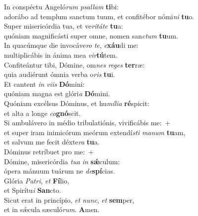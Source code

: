 \evenverse In conspéctu Angeló\textit{rum} \textit{psal}\textit{lam} \textbf{ti}bi:~\*\\
\evenverse adorábo ad templum sanctum tuum, et confitébor nómi\textit{ni} \textbf{tu}o.\\
\oddverse Super misericórdia tua, et ve\textit{ri}\textit{tá}\textit{te} \textbf{tu}a:~\*\\
\oddverse quóniam magnificásti super omne, nomen san\textit{ctum} \textbf{tu}um.\\
\evenverse In quacúmque die invocáve\textit{ro} \textit{te}, \textit{e}\textbf{xáu}di me:~\*\\
\evenverse multiplicábis in ánima mea \textit{vir}\textbf{tú}tem.\\
\oddverse Confiteántur tibi, Dómine, om\textit{nes} \textit{re}\textit{ges} \textbf{ter}ræ:~\*\\
\oddverse quia audiérunt ómnia verba o\textit{ris} \textbf{tu}i.\\
\evenverse Et cantent \textit{in} \textit{vi}\textit{is} \textbf{Dó}mini:~\*\\
\evenverse quóniam magna est glóri\textit{a} \textbf{Dó}mini.\\
\oddverse Quóniam excélsus Dóminus, et hu\textit{mí}\textit{li}\textit{a} \textbf{ré}spicit:~\*\\
\oddverse et alta a longe \textit{co}\textbf{gnó}scit.\\
\evenverse Si ambulávero in médio tribulatiónis, vivificábis me:~+\\
\evenverse  et super iram inimicórum meórum extendí\textit{sti} \textit{ma}\textit{num} \textbf{tu}am,~\*\\
\evenverse et salvum me fecit déxte\textit{ra} \textbf{tu}a.\\
\oddverse Dóminus retríbuet pro me:~+\\
\oddverse  Dómine, misericórdia \textit{tu}\textit{a} \textit{in} \textbf{sǽ}culum:~\*\\
\oddverse ópera mánuum tuárum ne \textit{de}\textbf{spí}cias.\\
\evenverse Glória \textit{Pa}\textit{tri}, \textit{et} \textbf{Fí}lio,~\*\\
\evenverse et Spirítu\textit{i} \textbf{San}cto.\\
\oddverse Sicut erat in princípio, \textit{et} \textit{nunc}, \textit{et} \textbf{sem}per,~\*\\
\oddverse et in sǽcula sæculó\textit{rum}. \textbf{A}men.\\

